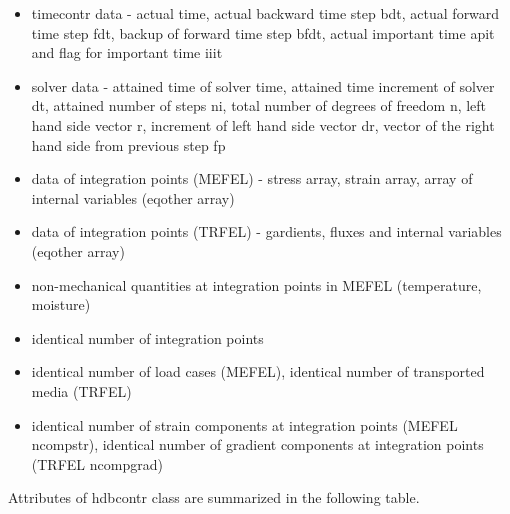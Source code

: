 \begin{itemize}
\item {\sf timecontr} data - actual {\sf time}, actual backward time step {\sf bdt}, actual 
      forward time step {\sf fdt},  backup of forward time step {\sf bfdt}, actual important time 
      {\sf apit} and flag for important time {\sf iiit}
\item solver data - attained time of solver {\sf time}, attained time increment of solver {\sf dt},
      attained number of steps {\sf ni}, total number of degrees of freedom {\sf n}, 
      left hand side vector {\sf r}, increment of left hand side vector {\sf dr}, vector of the right 
      hand side from previous step {\sf fp}
\item data of integration points (MEFEL) - stress array, strain array, array of internal variables ({\sf eqother} array) 
\item data of integration points (TRFEL) - gardients, fluxes and internal variables ({\sf eqother} array)
\item non-mechanical quantities at integration points in MEFEL (temperature, moisture)
\end{itemize}

\begin{itemize}
\item identical number of integration points
\item identical number of load cases (MEFEL), identical number of transported media (TRFEL)
\item identical number of strain components at integration points (MEFEL {\sf ncompstr}), 
      identical number of gradient components at integration points (TRFEL {\sf ncompgrad})
\end{itemize}

Attributes of {\sf hdbcontr} class are summarized in the following table.

